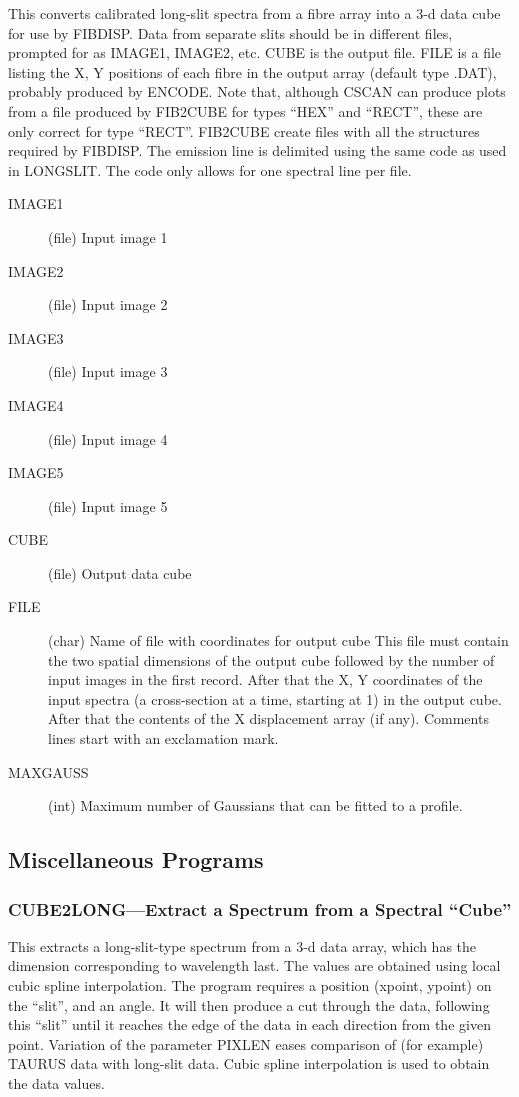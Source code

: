 This converts calibrated long-slit spectra from a fibre array into a
3-d data cube for use by FIBDISP.
Data from separate slits should be in different files, prompted for as
IMAGE1, IMAGE2, etc.
CUBE is the output file.
FILE is a file listing the X, Y positions of each fibre in the output
array (default type .DAT), probably produced by ENCODE.
Note that, although CSCAN can produce plots from a file produced by
FIB2CUBE for types ``HEX'' and ``RECT'', these are only correct for type
``RECT''.
FIB2CUBE create files with all the structures required by FIBDISP.
The emission line is delimited using the same code as used in LONGSLIT.
The code only allows for one spectral line per file.
\begin{description}
\item[IMAGE1] (file) Input image 1
\item[IMAGE2] (file) Input image 2
\item[IMAGE3] (file) Input image 3
\item[IMAGE4] (file) Input image 4
\item[IMAGE5] (file) Input image 5
\item[CUBE] (file) Output data cube
\item[FILE] (char) Name of file with coordinates for output cube This
file must contain the two spatial dimensions of the output cube followed
by the number of input images in the
first record. After that the X, Y coordinates of the input spectra (a
cross-section at a time, starting at 1) in the output cube.
After that the contents of the X displacement array (if any).
Comments lines start with an exclamation mark.
\item[MAXGAUSS] (int) Maximum number of Gaussians that can be fitted
to a profile.
\end{description}

\subsection{\label{miscellaneous_programs}Miscellaneous Programs}

\subsubsection{CUBE2LONG---Extract a Spectrum from a Spectral ``Cube''}

This extracts a long-slit-type spectrum from a 3-d data array, which
has the dimension corresponding to wavelength last. The values are
obtained using local cubic spline interpolation. The program requires
a position (xpoint, ypoint) on the ``slit'', and an angle. It will then
produce a cut through the data, following this ``slit'' until it reaches
the edge of the data in each direction from the given point. Variation
of the parameter PIXLEN eases comparison of (for example) TAURUS data
with long-slit data. Cubic spline interpolation is used to obtain the
data values.

